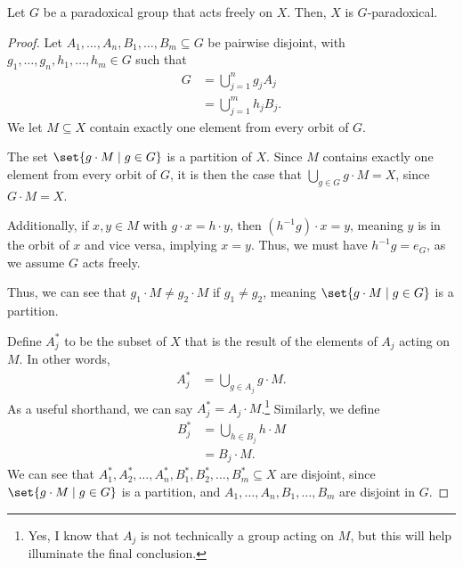 \documentclass[10pt]{mypackage}
\begin{document}
\begin{proposition}
  Let $G$ be a paradoxical group that acts freely on $X$. Then, $X$ is $G$-paradoxical.
\end{proposition}
\begin{proof}
  Let $A_1,\dots,A_n,B_1,\dots,B_m\subseteq G$ be pairwise disjoint, with $g_1,\dots,g_n,h_1,\dots,h_m\in G$ such that
  \begin{align*}
    G &= \bigcup_{j=1}^{n}g_j A_j\\
      &= \bigcup_{j=1}^{m}h_jB_j.
  \end{align*}
  We let $M\subseteq X$ contain exactly one element from every orbit of $G$.\newline

  The set $\set{g\cdot M\mid g\in G}$ is a partition of $X$. Since $M$ contains exactly one element from every orbit of $G$, it is then the case that $\bigcup_{g\in G}g\cdot M = X$, since $G\cdot M = X$.\newline

  Additionally, if $x,y\in M$ with $g\cdot x = h\cdot y$, then $\left(h^{-1}g\right)\cdot x = y$, meaning $y$ is in the orbit of $x$ and vice versa, implying $x = y$. Thus, we must have $h^{-1}g = e_G$, as we assume $G$ acts freely.\newline

  Thus, we can see that $g_1\cdot M \neq g_2\cdot M$ if $g_1\neq g_2$, meaning $\set{g\cdot M\mid g\in G}$ is a partition.\newline

  Define $A_{j}^{\ast}$ to be the subset of $X$ that is the result of the elements of $A_j$ acting on $M$. In other words,
  \begin{align*}
    A_j^{\ast} &= \bigcup_{g\in A_j}g\cdot M.
  \end{align*}
  As a useful shorthand, we can say $A_j^{\ast} = A_j\cdot M$.\footnote{Yes, I know that $A_j$ is not technically a group acting on $M$, but this will help illuminate the final conclusion.} Similarly, we define
  \begin{align*}
    B_j^{\ast} &= \bigcup_{h\in B_j}h\cdot M\\
               &= B_j\cdot M.
  \end{align*}
  We can see that $A_1^{\ast},A_2^{\ast},\dots,A_n^{\ast},B_1^{\ast},B_2^{\ast},\dots,B_m^{\ast}\subseteq X$ are disjoint, since $\set{g\cdot M\mid g\in G}$ is a partition, and $A_1,\dots,A_n,B_1,\dots,B_m$ are disjoint in $G$.\newline


\end{proof}
\end{document}
